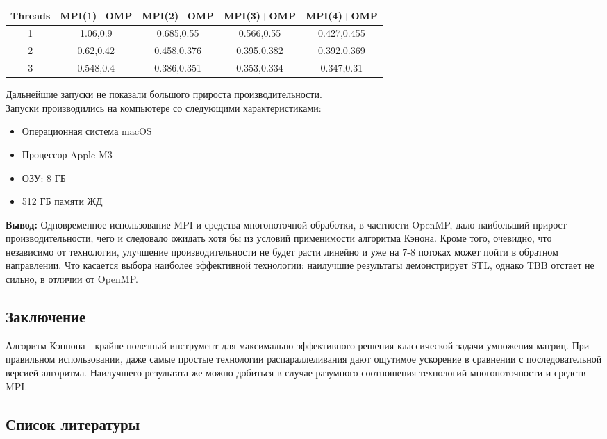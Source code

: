 \documentclass[20pt]{article}
\begin{document}
\begin{center}
    \begin{tabular}{|c|c|c|c|c|}
    \cline{1-5}
     Threads & MPI(1)+OMP & MPI(2)+OMP & MPI(3)+OMP & MPI(4)+OMP\\  \hline
      1 & 1.06,0.9 & 0.685,0.55 & 0.566,0.55 & 0.427,0.455 \\ \hline
      2 & 0.62,0.42 & 0.458,0.376 & 0.395,0.382 & 0.392,0.369\\ \hline
      3 & 0.548,0.4 & 0.386,0.351 & 0.353,0.334 & 0.347,0.31 \\ \hline
    \cline{1-5}
    \end{tabular}
\end{center} 

Дальнейшие запуски не показали большого прироста производительности. \\
Запуски производились на компьютере со следующими характеристиками:

\begin{itemize}
    \item Операционная система macOS
    \item Процессор Apple M3
    \item ОЗУ: 8 ГБ
    \item 512 ГБ памяти ЖД
\end{itemize} 

\textbf{Вывод:} Одновременное использование MPI и средства многопоточной обработки, в частности OpenMP, дало наибольший прирост производительности, чего и следовало ожидать хотя бы из условий применимости алгоритма Кэнона. Кроме того, очевидно, что независимо от технологии, улучшение производительности не будет расти линейно и уже на 7-8 потоках может пойти в обратном направлении. Что касается выбора наиболее эффективной технологии: наилучшие результаты демонстрирует STL, однако TBB отстает не сильно, в отличии от OpenMP.
\newpage
\begin{center}
    \section{Заключение}
\end{center} 

Алгоритм Кэннона - крайне полезный инструмент для максимально эффективного решения классической задачи умножения матриц. При правильном использовании, даже самые простые технологии распараллеливания дают ощутимое ускорение в сравнении с последовательной версией алгоритма. Наилучшего результата же можно добиться в случае разумного соотношения технологий многопоточности и средств MPI. 
\newpage
\begin{center}
    \section{Список литературы}
\end{center} 
\end{document}

